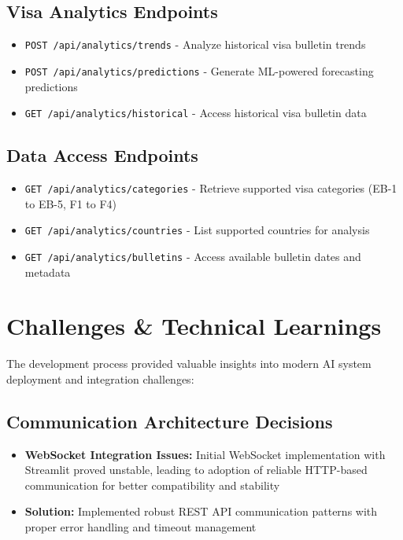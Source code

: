 \documentclass[11pt,a4paper]{article}
\newcommand{\code}[1]{\texttt{#1}}
\begin{document}
\subsection{Visa Analytics Endpoints}
\begin{itemize}[itemsep=0.3em]
    \item \code{POST /api/analytics/trends} - Analyze historical visa bulletin trends
    \item \code{POST /api/analytics/predictions} - Generate ML-powered forecasting predictions
    \item \code{GET /api/analytics/historical} - Access historical visa bulletin data
\end{itemize}

\subsection{Data Access Endpoints}
\begin{itemize}[itemsep=0.3em]
    \item \code{GET /api/analytics/categories} - Retrieve supported visa categories (EB-1 to EB-5, F1 to F4)
    \item \code{GET /api/analytics/countries} - List supported countries for analysis
    \item \code{GET /api/analytics/bulletins} - Access available bulletin dates and metadata
\end{itemize}

\newpage
\section{Challenges \& Technical Learnings}

The development process provided valuable insights into modern AI system deployment and integration challenges:

\subsection{Communication Architecture Decisions}
\begin{itemize}[itemsep=0.3em]
    \item \textbf{WebSocket Integration Issues:} Initial WebSocket implementation with Streamlit proved unstable, leading to adoption of reliable HTTP-based communication for better compatibility and stability
    \item \textbf{Solution:} Implemented robust REST API communication patterns with proper error handling and timeout management
\end{itemize}
\end{document}
